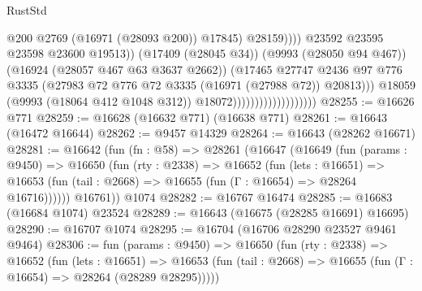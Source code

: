 \begin{lexlean}{RustStd}
\begin{coremodule}
                                                          @200
                                                          @2769
                                                          (@16971 (@28093 @200))
                                                          @17845)
                                                        @28159))))
                                                @23592
                                                @23595
                                                @23598
                                                @23600
                                                @19513))
                                            (@17409 (@28045 @34))
                                            (@9993 (@28050 @94 @467))
                                            (@16924 (@28057 @467 @63 @3637 @2662))
                                            (@17465
                                              @27747
                                              @2436
                                              @97
                                              @776
                                              @3335
                                              (@27983
                                                @72
                                                @776
                                                @72
                                                @3335
                                                (@16971 (@27988 @72))
                                                @20813)))
                                          @18059
                                          (@9993 (@18064 @412 @1048 @312))
                                          @18072)))))))))))))))))))
@28255 := @16626 @771
@28259 := @16628 (@16632 @771) (@16638 @771)
@28261 := @16643 (@16472 @16644)
@28262 := @9457 @14329
@28264 := @16643 (@28262 @16671)
@28281 := @16642
    (fun (fn : @58) =>
    @28261
      (@16647
        (@16649
          (fun (params : @9450) =>
          @16650
            (fun (rty : @2338) =>
            @16652
              (fun (lets : @16651) =>
              @16653 (fun (tail : @2668) => @16655 (fun (Γ : @16654) => @28264 @16716))))))
        @16761))
    @1074
@28282 := @16767 @16474
@28285 := @16683 (@16684 @1074) @23524
@28289 := @16643 (@16675 (@28285 @16691) @16695)
@28290 := @16707 @1074
@28295 := @16704 (@16706 @28290 @23527 @9461 @9464)
@28306 := fun (params : @9450) =>
  @16650
    (fun (rty : @2338) =>
    @16652
      (fun (lets : @16651) =>
      @16653 (fun (tail : @2668) => @16655 (fun (Γ : @16654) => @28264 (@28289 @28295)))))

\end{coremodule}
\end{lexlean}
